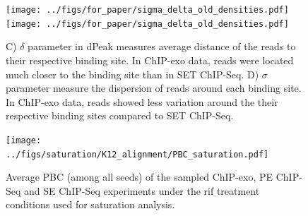 \documentclass{bmcart}\usepackage[]{graphicx}\usepackage[]{color}
\begin{document}
\begin{figure}[h!]
  \centering %
   \texttt{[image: ../figs/for\_paper/sigma\_delta\_old\_densities.pdf]}
   \texttt{[image: ../figs/for\_paper/sigma\_delta\_old\_densities.pdf]}   
  \caption{ C) $\delta$ parameter in dPeak measures average distance
    of the reads to their respective binding site. In ChIP-exo data,
    reads were located much closer to the binding site than in SET
    ChIP-Seq. D) $\sigma$ parameter measure the dispersion of reads
    around each binding site. In ChIP-exo data, reads showed less
    variation around the their respective binding sites compared to
    SET ChIP-Seq.}

\end{figure}

\newpage

\begin{figure}[h!]
  \centering
  \texttt{[image: ../figs/saturation/K12\_alignment/PBC\_saturation.pdf]}
  \caption{Average PBC (among all seeds) of the sampled ChIP-exo, PE
    ChIP-Seq and SE ChIP-Seq experiments under the rif treatment
    conditions used for saturation analysis.}
  \label{fig:pbc_saturation}
\end{figure}

\newpage
\end{document}
